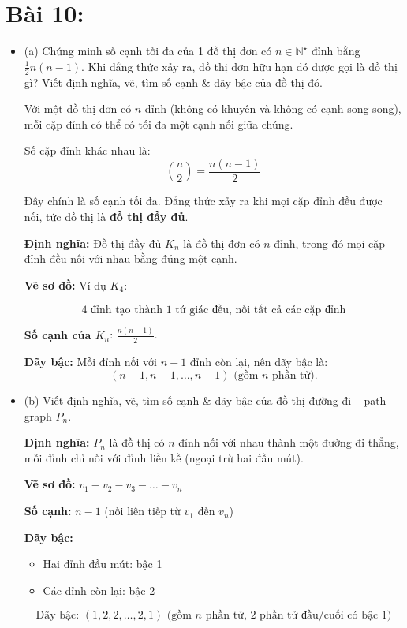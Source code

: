 \documentclass{article}
\begin{document}
	\section*{Bài 10:}
	\begin{itemize}
	 \item (a) Chứng minh số cạnh tối đa của 1 đồ thị đơn có $n\in\mathbb{N}^\star$ đỉnh bằng $\frac{1}{2}n(n - 1)$. Khi đẳng thức xảy ra, đồ thị đơn hữu hạn đó được gọi là đồ thị gì? Viết định nghĩa, vẽ, tìm số cạnh \& dãy bậc của đồ thị đó. 
	 
	 Với một đồ thị đơn có $n$ đỉnh (không có khuyên và không có cạnh song song), mỗi cặp đỉnh có thể có tối đa một cạnh nối giữa chúng.
	 
	 Số cặp đỉnh khác nhau là:
	 \[
	 \binom{n}{2} = \frac{n(n - 1)}{2}
	 \]
	 
	 Đây chính là số cạnh tối đa. Đẳng thức xảy ra khi mọi cặp đỉnh đều được nối, tức đồ thị là \textbf{đồ thị đầy đủ}.
	 
	 \textbf{Định nghĩa:} Đồ thị đầy đủ $K_n$ là đồ thị đơn có $n$ đỉnh, trong đó mọi cặp đỉnh đều nối với nhau bằng đúng một cạnh.
	 
	 \textbf{Vẽ sơ đồ:} Ví dụ $K_4$:
	 
	 \[
	 \text{4 đỉnh tạo thành 1 tứ giác đều, nối tất cả các cặp đỉnh}
	 \]
	 
	 \textbf{Số cạnh của $K_n$}: $\frac{n(n-1)}{2}$.
	 
	 \textbf{Dãy bậc:} Mỗi đỉnh nối với $n-1$ đỉnh còn lại, nên dãy bậc là:
	 \[
	 (n-1, n-1, \ldots, n-1) \text{ (gồm $n$ phần tử)}.
	 \]
	 
	 \item (b) Viết định nghĩa, vẽ, tìm số cạnh \& dãy bậc của đồ thị đường đi -- path graph $P_n$. 
	 
	 \textbf{Định nghĩa:} $P_n$ là đồ thị có $n$ đỉnh nối với nhau thành một đường đi thẳng, mỗi đỉnh chỉ nối với đỉnh liền kề (ngoại trừ hai đầu mút).
	 
	 \textbf{Vẽ sơ đồ:} $v_1 - v_2 - v_3 - \ldots - v_n$
	 
	 \textbf{Số cạnh:} $n - 1$ (nối liên tiếp từ $v_1$ đến $v_n$)
	 
	 \textbf{Dãy bậc:}
	 \begin{itemize}
	 	\item Hai đỉnh đầu mút: bậc 1
	 	\item Các đỉnh còn lại: bậc 2
	 \end{itemize}
	 \[
	 \text{Dãy bậc: } (1, 2, 2, \ldots, 2, 1) \text{ (gồm $n$ phần tử, 2 phần tử đầu/cuối có bậc 1)}
	 \]
	 

\end{itemize}
\end{document}
